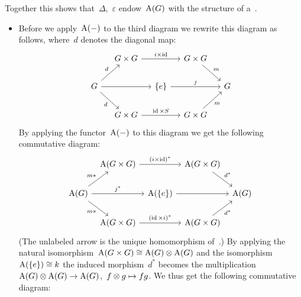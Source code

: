\begin{fluff}
  Together this shows that~$\Delta$,~$\varepsilon$ endow~$\operatorname{A}(G)$ with the structure of a~.
  \begin{itemize}[resume]
    \item
      Before we apply~$\operatorname{A}(-)$ to the third diagram we rewrite this diagram as follows, where~$d$ denotes the diagonal map:
      \[
        \begin{tikzcd}[column sep = small]
            {}
          & G \times G
            \arrow{rr}[above]{i \times \id}
          & {}
          & G \times G
            \arrow{dr}[above right]{m}
          & {}
          \\
            G
            \arrow{ur}[above left]{d}
            \arrow{rr}[above]{}
            \arrow{dr}[below left]{d}
          & {}
          & \{e\}
            \arrow{rr}[above]{j}
          & {}
          & G
          \\
            {}
          & G \times G
            \arrow{rr}[above]{\id \times S}
          & {}
          & G \times G
            \arrow{ur}[below right]{m}
          & {}
        \end{tikzcd}
      \]
      By applying the functor~$\operatorname{A}(-)$ to this diagram we get the following commutative diagram:
      \[
        \begin{tikzcd}[column sep = tiny]
            {}
          & \coord(G \times G)
            \arrow{rr}[above]{(i \times \id)^*}
          & {}
          & \coord(G \times G)
            \arrow{dr}[above right]{d^*}
          & {}
          \\
            \coord(G)
            \arrow{ur}[above left]{m*}
            \arrow{rr}[above]{j^*}
            \arrow{dr}[below left]{m*}
          & {}
          & \coord(\{e\})
            \arrow{rr}
          & {}
          & \coord(G)
          \\
            {}
          & \coord(G \times G)
            \arrow{rr}[above]{(\id \times i)^*}
          & {}
          & \coord(G \times G)
            \arrow{ur}[below right]{d^*}
          & {}
        \end{tikzcd}
      \]
      (The unlabeled arrow is the unique homomorphism of~.)
      By applying the natural isomorphism~$\operatorname{A}(G \times G) \cong \operatorname{A}(G) \mathbin{\otimes} \operatorname{A}(G)$ and the isomorphism~$\operatorname{A}(\{e\}) \cong k$ the induced morphism~$d^*$ becomes the multiplication~$\operatorname{A}(G) \mathbin{\otimes} \operatorname{A}(G) \to \operatorname{A}(G)$,~$f \mathbin{\otimes} g \mapsto fg$.
      We thus get the following commutative diagram:
            \[
\]
\end{itemize}
\end{fluff}
